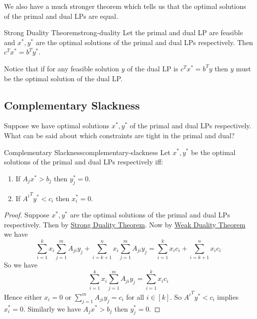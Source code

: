 We also have a much stronger theorem which tells us that the optimal solutions of the primal and dual LPs are equal. 
\begin{Theorem}{Strong Duality Theorem}{strong-duality}
	Let the primal and dual LP are feasible and $x^*,y^*$ are the optimal solutions of the primal and dual LPs respectively. Then $c^Tx^*=b^Ty^*$.
\end{Theorem}
Notice that if for any feasible solution $y$ of the dual LP is $c^Tx^*=b^Ty$ then $y$ must be the optimal solution of the dual LP. 
\subsection{Complementary Slackness}
\begin{question}{}{}
	Suppose we have optimal solutions $x^*,y^*$ of the primal and dual LPs respectively. What can be said about which constraints are tight in the primal and dual?
\end{question}
\begin{Theorem}{Complementary Slackness}{complementary-slackness}
	Let $x^*,y^*$ be the optimal solutions of the primal and dual LPs respectively iff:
	\begin{enumerate}[label=(\roman*)]
		\item If $A_jx^*>b_j$ then $y_j^*=0$.
		\item If ${A^i}^Ty^*<c_i$ then $x_i^*=0$.
	\end{enumerate}
\end{Theorem}
\begin{proof}
	Suppose $x^*,y^*$ are the optimal solutions of the primal and dual LPs respectively. Then by \hyperref[th:strong-duality]{Strong Duality Theorem}. Now by \hyperref[th:weak-duality]{Weak Duality Theorem} we have $$\sum\limits_{i=1}^k x_i\sum\limits_{j=1}^m A_{ji}y_j+\sum\limits_{i=k+1}^n x_i\sum\limits_{j=1}^m A_{ji}y_j=\sum\limits_{i=1}^k x_ic_i+\sum\limits_{i=k+1}^n x_ic_i$$So we have $$\sum\limits_{i=1}^k x_i\sum\limits_{j=1}^m A_{ji}y_j=\sum\limits_{i=1}^k x_ic_i$$Hence either $x_i=0$ or $\sum\limits_{j=1}^m A_{ji}y_j=c_i$ for all $i\in[k]$. So ${A^i}^Ty^*<c_i$ implies $x_i^*=0$. Similarly we have $A_jx^*>b_j$ then $y_j^*=0$.
\end{proof}
